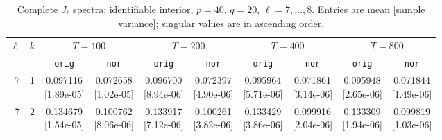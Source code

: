 \documentclass[12pt,letterpaper]{article}
\def\spacingset#1{\renewcommand{\baselinestretch}{#1}\small\normalsize}
\theoremstyle{plain}
\theoremstyle{definition}
\begin{document}
\clearpage
\begin{table}[p]
\begingroup
\spacingset{1.0}
\small\centering
\caption{Complete $J_\ell$ spectra: identifiable interior, $p=40$, $q=20$, $\ell=7,\ldots,8$. Entries are mean [sample variance]; singular values are in ascending order.}
\label{s23:lambda:alltab:spectra:p40q20interior:7-8}
\footnotesize
\setlength{\tabcolsep}{2.2pt}
\renewcommand{\arraystretch}{1.03}
\begin{adjustbox}{max width=\linewidth}
\begin{tabular}{@{}rr*{8}{c}@{}}
\toprule
$\ell$ & $k$ & \multicolumn{2}{c}{$T=100$} & \multicolumn{2}{c}{$T=200$} & \multicolumn{2}{c}{$T=400$} & \multicolumn{2}{c}{$T=800$}\\
\cmidrule(lr){3-4}\cmidrule(lr){5-6}\cmidrule(lr){7-8}\cmidrule(lr){9-10}
 &  & \texttt{orig} & \texttt{nor} & \texttt{orig} & \texttt{nor} & \texttt{orig} & \texttt{nor} & \texttt{orig} & \texttt{nor}\\
\midrule
7 & 1 & \shortstack{0.097116\\[-1pt]{\scriptsize[1.89e-05]}} & \shortstack{0.072658\\[-1pt]{\scriptsize[1.02e-05]}} & \shortstack{0.096700\\[-1pt]{\scriptsize[8.94e-06]}} & \shortstack{0.072397\\[-1pt]{\scriptsize[4.90e-06]}} & \shortstack{0.095964\\[-1pt]{\scriptsize[5.71e-06]}} & \shortstack{0.071861\\[-1pt]{\scriptsize[3.14e-06]}} & \shortstack{0.095948\\[-1pt]{\scriptsize[2.65e-06]}} & \shortstack{0.071844\\[-1pt]{\scriptsize[1.49e-06]}}\\
7 & 2 & \shortstack{0.134679\\[-1pt]{\scriptsize[1.54e-05]}} & \shortstack{0.100762\\[-1pt]{\scriptsize[8.06e-06]}} & \shortstack{0.133917\\[-1pt]{\scriptsize[7.12e-06]}} & \shortstack{0.100261\\[-1pt]{\scriptsize[3.82e-06]}} & \shortstack{0.133429\\[-1pt]{\scriptsize[3.86e-06]}} & \shortstack{0.099916\\[-1pt]{\scriptsize[2.04e-06]}} & \shortstack{0.133309\\[-1pt]{\scriptsize[1.94e-06]}} & \shortstack{0.099819\\[-1pt]{\scriptsize[1.03e-06]}}\\

\end{tabular}
\end{adjustbox}
\end{table}
\end{document}
